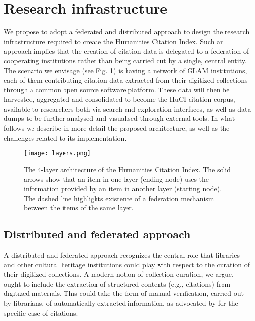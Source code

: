 \section{Research infrastructure}\label{sec:research-infrastructure}

We propose to adopt a federated and distributed approach to design the research infrastructure required to create the Humanities Citation Index. Such an approach implies that the creation of citation data is delegated to a federation of cooperating institutions rather than being carried out by a single, central entity. The scenario we envisage (see Fig. \ref{fig:huci-high-level}) is having a network of GLAM institutions, each of them contributing citation data extracted from their digitized collections through a common open source software platform. These data will then be harvested, aggregated and consolidated to become the HuCI citation corpus, available to researchers both via search and exploration interfaces, as well as data dumps to be further analysed and visualised through external tools. In what follows we describe in more detail the proposed architecture, as well as the challenges related to its implementation.

\begin{figure}[h]%
\centering
\texttt{[image: layers.png]}
\caption{The 4-layer architecture of the Humanities Citation Index. The solid arrows show that an item in one layer (ending node) uses the information provided by an item in another layer (starting node). The dashed line highlights existence of a federation mechanism between the items of the same layer.
\label{fig:huci-high-level}}
\end{figure}

\subsection{Distributed and federated approach}

A distributed and federated approach recognizes the central role that libraries and other cultural heritage institutions could play with respect to the curation of their digitized collections. A modern notion of collection curation, we argue, ought to include the extraction of structured contents (e.g., citations) from digitized materials. This could take the form of manual verification, carried out by librarians, of automatically extracted information, as advocated by \cite{lauscher_linked_2018} for the specific case of citations.   

